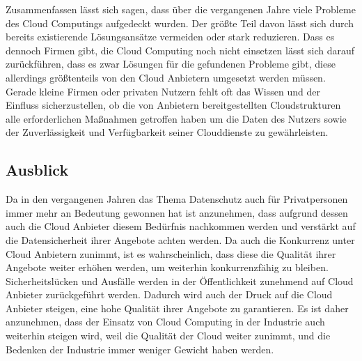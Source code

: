Zusammenfassen lässt sich sagen, dass über die vergangenen Jahre viele Probleme des Cloud Computings aufgedeckt wurden. Der größte Teil davon lässt sich durch bereits existierende Lösungsansätze vermeiden oder stark reduzieren. Dass es dennoch Firmen gibt, die Cloud Computing noch nicht einsetzen lässt sich darauf zurückführen, dass es zwar Lösungen für die gefundenen Probleme gibt, diese allerdings größtenteils von den Cloud Anbietern umgesetzt werden müssen. Gerade kleine Firmen oder privaten Nutzern fehlt oft das Wissen und der Einfluss sicherzustellen, ob die von Anbietern bereitgestellten Cloudstrukturen alle erforderlichen Maßnahmen getroffen haben um die Daten des Nutzers sowie der Zuverlässigkeit und Verfügbarkeit seiner Clouddienste zu gewährleisten.

\subsection{Ausblick}
Da in den vergangenen Jahren das Thema Datenschutz auch für Privatpersonen immer mehr an Bedeutung gewonnen hat ist anzunehmen, dass aufgrund dessen auch die Cloud Anbieter diesem Bedürfnis nachkommen werden und verstärkt auf die Datensicherheit ihrer Angebote achten werden. 
Da auch die Konkurrenz unter Cloud Anbietern zunimmt, ist es wahrscheinlich, dass diese die Qualität ihrer Angebote weiter erhöhen werden, um weiterhin konkurrenzfähig zu bleiben.
Sicherheitslücken und Ausfälle werden in der Öffentlichkeit zunehmend auf Cloud Anbieter zurückgeführt werden. Dadurch wird auch der Druck auf die Cloud Anbieter steigen, eine hohe Qualität ihrer Angebote zu garantieren.
Es ist daher anzunehmen, dass der Einsatz von Cloud Computing in der Industrie auch weiterhin steigen wird, weil die Qualität der Cloud weiter zunimmt, und die Bedenken der Industrie immer weniger Gewicht haben werden.


